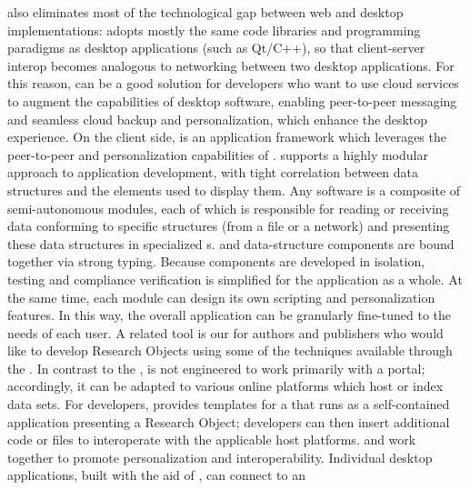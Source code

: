 \documentclass[11pt,letterpaper]{article}
\begin{document}
{\NDPCloud} also eliminates most of the technological 
gap between web and desktop implementations:   
{\NDPCloud} adopts mostly the same code libraries 
and programming paradigms as 
desktop applications (such as Qt/C++), 
so that client-server interop 
becomes analogous to networking between two 
desktop applications.  For this reason, {\NDPCloud} 
can be a good solution for developers who want to 
use cloud services to augment the capabilities 
of desktop software, enabling peer-to-peer 
messaging and seamless cloud backup and 
personalization, which enhance the desktop experience.
\p{}
\lead{{\VersatileUX}} On the client side, {\VersatileUX} is an {\GUI} 
application framework which leverages 
the peer-to-peer and personalization 
capabilities of {\NDPCloud}.  {\VersatileUX} 
supports a highly modular approach to 
application development, with tight 
correlation between data structures and the {\GUI} 
elements used to display them.  Any {\VersatileUX} 
software is a composite of semi-autonomous  
modules, each of which is responsible for 
reading or receiving data conforming 
to specific structures (from a file or a network) 
and presenting these data structures in specialized 
{\GUI}s.  {\lfGUI} and data-structure components are 
bound together via strong typing.  Because {\VersatileUX} 
components are developed in isolation, testing and 
compliance verification is simplified for the application 
as a whole.  At the same time, each {\VersatileUX} 
module can design its own scripting and personalization 
features.  In this way, the overall application can be 
granularly fine-tuned to the needs of each user.
\p{}
  A related tool is our 
 for authors and publishers who would 
like to develop Research Objects using some of the techniques 
available through the {\MOSAIC} {\SDK}.  In contrast to the 
{\SDK}, {\dsC} is not engineered to work 
primarily with a {\MOSAIC} portal; accordingly, it can be adapted to 
various online platforms which host or index data sets.  
For developers, {\dsC} provides templates for a 
{\MOSAIC} {\RAK} that runs as a self-contained application 
presenting a Research Object; developers can then insert 
additional code or files to interoperate with the 
applicable host platforms. 
\vspace{-1.4em}
\EnglischeLinie
\vspace{-.2em}
{\lfNDPCloud} and {\VersatileUX} work together to 
promote personalization and interoperability.  
Individual desktop applications, built 
with the aid of {\VersatileUX}, can connect to an 
\end{document}

